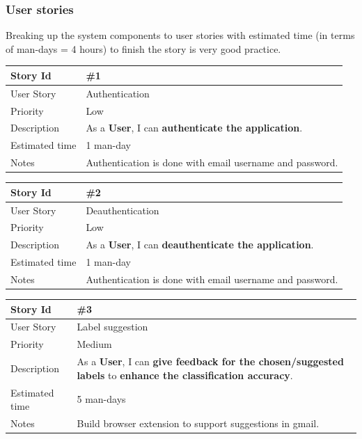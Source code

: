 \subsubsection{User stories}
Breaking up the system components to user stories with estimated time (in terms
of man-days = 4 hours) to finish the story is very good practice.
\\

\begin{tabular}{|p{3cm}|p{10cm}|}
\hline
\cellcolor[gray]{0.9} Story Id & \#1 \\ \hline
\cellcolor[gray]{0.9} User Story & Authentication \\ \hline
\cellcolor[gray]{0.9} Priority & Low \\ \hline
\cellcolor[gray]{0.9} Description & 
      As a \textbf{User}, I can \textbf{authenticate the application}. \\ \hline
\cellcolor[gray]{0.9} Estimated time & 1 man-day \\ \hline
\cellcolor[gray]{0.9} Notes & 
      Authentication is done with email username and password. \\ \hline
\end{tabular}

\begin{tabular}{|p{3cm}|p{10cm}|}
\hline
\cellcolor[gray]{0.9} Story Id & \#2 \\ \hline
\cellcolor[gray]{0.9} User Story & Deauthentication \\ \hline
\cellcolor[gray]{0.9} Priority & Low \\ \hline
\cellcolor[gray]{0.9} Description & 
	As a \textbf{User}, I can \textbf{deauthenticate the application}. \\ \hline
\cellcolor[gray]{0.9} Estimated time & 1 man-day \\ \hline
\cellcolor[gray]{0.9} Notes & 
	Authentication is done with email username and password. \\ \hline
\end{tabular}

\begin{tabular}{|p{3cm}|p{10cm}|}
\hline
\cellcolor[gray]{0.9} Story Id & \#3 \\ \hline
\cellcolor[gray]{0.9} User Story & Label suggestion \\ \hline
\cellcolor[gray]{0.9} Priority & Medium\\ \hline
\cellcolor[gray]{0.9} Description & 
	As a \textbf{User}, I can \textbf{give feedback for the chosen/suggested labels} to
	\textbf{enhance the classification accuracy}. \\ \hline
\cellcolor[gray]{0.9} Estimated time & 5 man-days\\ \hline
\cellcolor[gray]{0.9} Notes & 
	Build browser extension to support suggestions in gmail. \\ \hline
\end{tabular}

